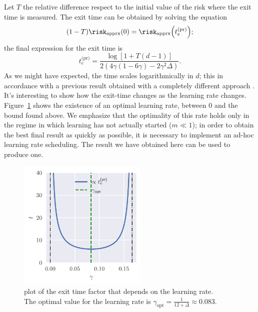 Let \(T\) the relative difference respect to the initial value of the risk where the exit time is measured.
The exit time can be obtained by solving the equation
\[
  (1-T)\risk_\text{apprx}{(0)} = \risk_\text{apprx}{\left(t^\text{(pr)}_e\right)};
\]
the final expression for the exit time is
\[
  t^\text{(pr)}_e = \frac{\log\left[1+T(d-1)\right]}{2\left(4\gamma(1-6\gamma)-2\gamma^2\Delta\right)}.
\]
As we might have expected, the time scales logarithmically in \(d\); this in accordance with a previous result obtained 
with a completely different approach \cite{arous2021online}.
It's interesting to show how the exit-time changes as the learning rate changes.
Figure~\ref{fig:time_learnignrate_plot} shows the existence of an optimal learning rate, between 0 and the bound found above.
We emphasize that the optimality of this rate holds only in the regime in which learning has not actually started (\(m\ll1\));
in order to obtain the best final result as quickly as possible, it is necessary to implement an ad-hoc learning rate scheduling.
The result we have obtained here can be used to produce one.
\begin{figure}
  \centering
  \includegraphics[width=0.55\textwidth]{figures/spherical/gamma_te-factor.pdf}
  \caption{
    plot of the exit time factor that depends on the learning rate.\\
    The optimal value for the learning rate is \(\gamma_\text{opt} = \frac{1}{12+\Delta} \approx \num{0.083}.\)
  }
  \label{fig:time_learnignrate_plot}
\end{figure}

